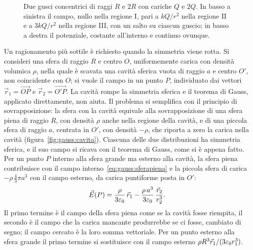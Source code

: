 \documentclass[11pt,a4paper]{article}
\begin{document}
\begin{figure}[htbp]
	\caption{Due gusci concentrici di raggi $R$ e $2R$ con cariche $Q$ e $2Q$. In basso a sinistra il campo, nullo nella regione I, pari a $kQ/r^2$ nella regione II e a $3kQ/r^2$ nella regione III, con un salto su ciascun guscio; in basso a destra il potenziale, costante all'interno e continuo ovunque.}
	\label{fig:gauss:gusci}
\end{figure}

Un ragionamento più sottile è richiesto quando la simmetria viene rotta. Si consideri una sfera di raggio $R$ e centro $O$, uniformemente carica con densità volumica $\rho$, nella quale è scavata una cavità sferica vuota di raggio $a$ e centro $O'$, non coincidente con $O$; si vuole il campo in un punto $P$, individuato dai vettori $\vec{r}_1=\overrightarrow{OP}$ e $\vec{r}_2=\overrightarrow{O'P}$. La cavità rompe la simmetria sferica e il teorema di Gauss, applicato direttamente, non aiuta. Il problema si semplifica con il principio di sovrapposizione: la sfera con la cavità equivale alla sovrapposizione di una sfera piena di raggio $R$, con densità $\rho$ anche nella regione della cavità, e di una piccola sfera di raggio $a$, centrata in $O'$, con densità $-\rho$, che riporta a zero la carica nella cavità (figura~\ref{fig:gauss:cavita}). Ciascuna delle due distribuzioni ha simmetria sferica, e il suo campo si ricava con il teorema di Gauss, come si è appena fatto. Per un punto $P$ interno alla sfera grande ma esterno alla cavità, la sfera piena contribuisce con il campo interno~\eqref{eq:gauss:sferapiena} e la piccola sfera di carica $-\rho\,\tfrac43\pi a^3$ con il campo esterno, da carica puntiforme posta in $O'$:
\[
\vec{E}(P)=\frac{\rho}{3\varepsilon_0}\,\vec{r}_1-\frac{\rho\,a^3}{3\varepsilon_0}\,\frac{\vec{r}_2}{r_2^3} .
\]
Il primo termine è il campo della sfera piena come se la cavità fosse riempita, il secondo è il campo che la carica mancante produrrebbe se ci fosse, cambiato di segno; il campo cercato è la loro somma vettoriale. Per un punto esterno alla sfera grande il primo termine si sostituisce con il campo esterno $\rho R^3\vec{r}_1/(3\varepsilon_0 r_1^3)$.
\end{document}

